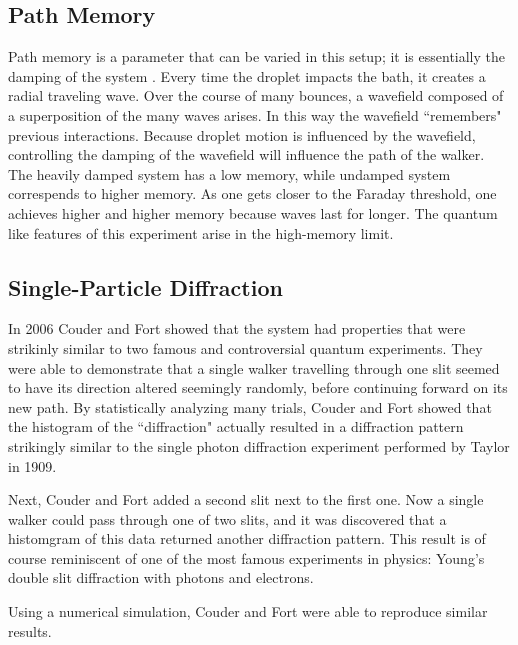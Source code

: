             \subsection{Path Memory}
                        
            Path memory is a parameter that can be varied in this setup; it is essentially the damping of the system \cite{Eddi2011}. Every time the droplet impacts the bath, it creates a radial traveling wave. Over the course of many bounces, a wavefield composed of a superposition of the many waves arises. In this way the wavefield ``remembers" previous interactions. Because droplet motion is influenced by the wavefield, controlling the damping of the wavefield will influence the path of the walker. The heavily damped system has a low memory, while undamped system correspends to higher memory. As one gets closer to the Faraday threshold, one achieves higher and higher memory because waves last for longer. The quantum like features of this experiment arise in the high-memory limit. 
            
             \subsection{Single-Particle Diffraction}
In 2006 Couder and Fort showed that the system had properties that were strikinly similar to two famous and controversial quantum experiments\cite{double-slit}. They were able to demonstrate that a single walker travelling through one slit seemed to have its direction altered seemingly randomly, before continuing forward on its new path. By statistically analyzing many trials, Couder and Fort showed that the histogram of the ``diffraction" actually resulted in a diffraction pattern strikingly similar to the single photon diffraction experiment performed by Taylor in 1909. 

Next, Couder and Fort added a second slit next to the first one. Now a single walker could pass through  one of two slits, and it was discovered that a histomgram of this data returned another diffraction pattern. This result is of course reminiscent of one of the most famous experiments in physics: Young's double slit diffraction with photons and electrons. 
    
Using a numerical simulation, Couder and Fort were able to reproduce similar results. 
    
